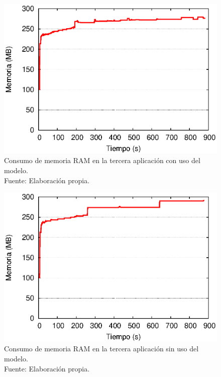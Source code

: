 \begin{figure}[!ht]
	\centering
	\captionsetup{justification=centering}
    \includegraphics[scale=0.7]{images/exp/app3/cm/fisical/consumeRAM.eps}
    \caption[Consumo de memoria RAM en la tercera aplicaci\'on con uso del modelo.]{Consumo de memoria RAM en la tercera aplicaci\'on con uso del modelo.\\Fuente: Elaboraci\'on propia.}
    \label{fig:app3-consumeRAM-cm}
\end{figure}

\begin{figure}[!ht]
	\centering
	\captionsetup{justification=centering}
    \includegraphics[scale=0.7]{images/exp/app3/sm/fisical/consumeRAM.eps}
    \caption[Consumo de memoria RAM en la tercera aplicaci\'on sin uso del modelo.]{Consumo de memoria RAM en la tercera aplicaci\'on sin uso del modelo.\\Fuente: Elaboraci\'on propia.}
    \label{fig:app3-consumeRAM-sm}
\end{figure}

